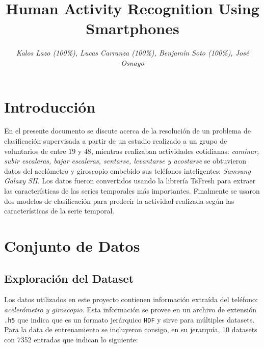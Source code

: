 \documentclass[conference]{IEEEtran}
\begin{document}
    \title{Human Activity Recognition Using Smartphones\\}

    \author{\textit{Kalos Lazo (100\%), Lucas Carranza (100\%), Benjamín Soto (100\%), José Osnayo}}
\maketitle

\section{Introducción}
En el presente documento se discute acerca de la resolución de un problema de clasificación supervisada a partir de un estudio realizado a un grupo de voluntarios de entre $19$ y $48$, mientras realizaban actividades cotidianas: \textit{caminar, subir escaleras, bajar escaleras, sentarse, levantarse y acostarse} se obtuvieron datos del acelómetro y giroscopio embebido sus teléfonos inteligentes: \textit{Samsung Galaxy SII}. Los datos fueron convertidos usando la librería TsFresh para extraer las características de las series temporales más importantes. Finalmente se usaron dos modelos de clasificación para predecir la actividad realizada según las características de la serie temporal.

\section{Conjunto de Datos}
\subsection{Exploración del Dataset}
Los datos utilizados en este proyecto contienen información extraída del teléfono: \textit{acelerómetro y giroscopio}. Esta información se provee en un archivo de extensión \texttt{.h5} que indica que es un formato jerárquico \texttt{HDF} y sirve para múltiples datasets. Para la data de entrenamiento se incluyeron consigo, en su jerarquía, 10 datasets con 7352 entradas que indican lo siguiente:
\end{document}
